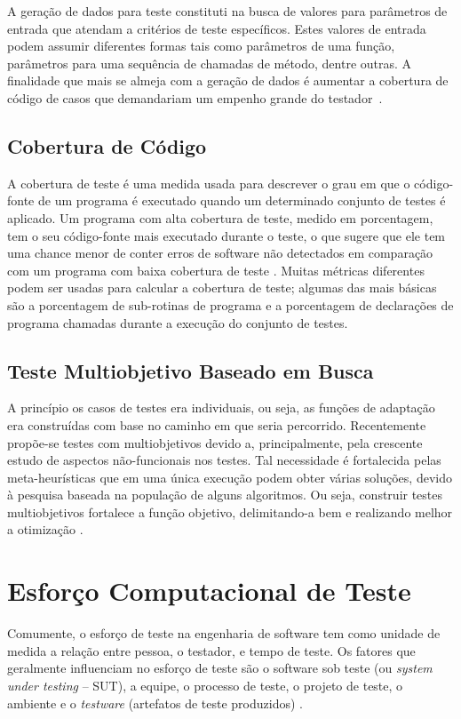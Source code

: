 A geração de dados para teste constituti na busca de valores para parâmetros de entrada que atendam a critérios de teste específicos. Estes valores de entrada podem assumir diferentes formas tais como parâmetros de uma função, parâmetros para uma sequência de chamadas de método, dentre outras. A finalidade que mais se almeja com a geração de dados é aumentar a cobertura de código de casos que demandariam um empenho grande do testador~\cite{huo2017genetic}.

\subsection{Cobertura de Código}

A cobertura de teste é uma medida usada para descrever o grau em que o código-fonte de um programa é executado quando um determinado conjunto de testes é aplicado. Um programa com alta cobertura de teste, medido em porcentagem, tem o seu código-fonte mais executado durante o teste, o que sugere que ele tem uma chance menor de conter erros de software não detectados em comparação com um programa com baixa cobertura de teste \cite{yang2009survey}. Muitas métricas diferentes podem ser usadas para calcular a cobertura de teste; algumas das mais básicas são a porcentagem de sub-rotinas de programa e a porcentagem de declarações de programa chamadas durante a execução do conjunto de testes.

\subsection{Teste Multiobjetivo Baseado em Busca}

A princípio os casos de testes era individuais, ou seja, as funções de adaptação era construídas com base no caminho em que seria percorrido. Recentemente propõe-se testes com multiobjetivos devido a, principalmente, pela
crescente estudo de aspectos não-funcionais nos testes. Tal necessidade é fortalecida pelas meta-heurísticas que em uma única execução podem obter várias soluções, devido à pesquisa baseada na população de alguns algoritmos. Ou seja, construir testes multiobjetivos fortalece a função objetivo, delimitando-a bem e realizando melhor a otimização \cite{huo2017genetic}. 

\section{Esforço Computacional de Teste}

Comumente, o esforço de teste na engenharia de software tem como unidade de medida a relação entre pessoa, o testador, e tempo de teste. Os fatores que geralmente influenciam no esforço de teste são o software sob teste (ou \textit{system under testing} – SUT), a equipe, o processo de teste, o projeto  de teste, o ambiente e o \textit{testware} (artefatos  de  teste  produzidos) \cite{silva2014estimativa}.

